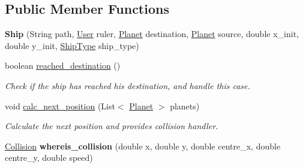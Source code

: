 \subsection*{Public Member Functions}
\begin{DoxyCompactItemize}
\item 
\mbox{\label{classfr_1_1groupe40_1_1projet_1_1model_1_1ships_1_1_ship_a50b240c8ac54e3944b63208c5df4cb91}} 
{\bfseries Ship} (String path, \mbox{\hyperlink{classfr_1_1groupe40_1_1projet_1_1client_1_1_user}{User}} ruler, \mbox{\hyperlink{classfr_1_1groupe40_1_1projet_1_1model_1_1planets_1_1_planet}{Planet}} destination, \mbox{\hyperlink{classfr_1_1groupe40_1_1projet_1_1model_1_1planets_1_1_planet}{Planet}} source, double x\+\_\+init, double y\+\_\+init, \mbox{\hyperlink{classfr_1_1groupe40_1_1projet_1_1model_1_1ships_1_1_ship_type}{Ship\+Type}} ship\+\_\+type)
\item 
\mbox{\label{classfr_1_1groupe40_1_1projet_1_1model_1_1ships_1_1_ship_a4526f55c2d198ce47e0f64b924ec6b43}} 
boolean \mbox{\hyperlink{classfr_1_1groupe40_1_1projet_1_1model_1_1ships_1_1_ship_a4526f55c2d198ce47e0f64b924ec6b43}{reached\+\_\+destination}} ()
\begin{DoxyCompactList}\small\item\em Check if the ship has reached his destination, and handle this case. \end{DoxyCompactList}\item 
void \mbox{\hyperlink{classfr_1_1groupe40_1_1projet_1_1model_1_1ships_1_1_ship_adfd10eb0bb2fe81b8612a9da7acc8148}{calc\+\_\+next\+\_\+position}} (List$<$ \mbox{\hyperlink{classfr_1_1groupe40_1_1projet_1_1model_1_1planets_1_1_planet}{Planet}} $>$ planets)
\begin{DoxyCompactList}\small\item\em Calculate the next position and provides collision handler. \end{DoxyCompactList}\item 
\mbox{\label{classfr_1_1groupe40_1_1projet_1_1model_1_1ships_1_1_ship_a61ff5b3481a94b0d495e7552cf0c0761}} 
\mbox{\hyperlink{enumfr_1_1groupe40_1_1projet_1_1util_1_1_collision}{Collision}} {\bfseries whereis\+\_\+collision} (double x, double y, double centre\+\_\+x, double centre\+\_\+y, double speed)

\end{DoxyCompactItemize}
